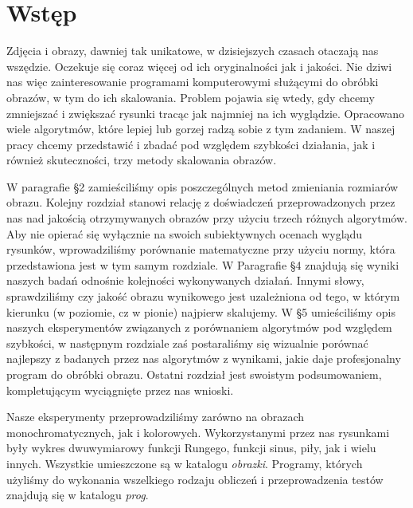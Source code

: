 \section{Wstęp}
Zdjęcia i obrazy, dawniej tak unikatowe, w dzisiejszych czasach otaczają nas
wszędzie. Oczekuje się coraz więcej od ich oryginalności jak i jakości. Nie
dziwi nas więc zainteresowanie programami komputerowymi służącymi do obróbki
obrazów, w tym do ich skalowania. Problem pojawia się wtedy, gdy chcemy zmniejszać i zwiększać
rysunki tracąc jak najmniej na ich wyglądzie. Opracowano wiele algorytmów,
które lepiej lub gorzej radzą sobie z tym zadaniem. W naszej pracy chcemy
przedstawić i zbadać pod względem szybkości działania, jak i również
skuteczności, trzy metody skalowania obrazów.

W paragrafie \S2 zamieściliśmy opis poszczególnych metod zmieniania
rozmiarów obrazu. Kolejny rozdział stanowi relację z doświadczeń
przeprowadzonych przez nas nad jakością otrzymywanych obrazów przy
użyciu trzech różnych algorytmów. Aby nie opierać się wyłącznie na swoich
subiektywnych ocenach wyglądu rysunków, wprowadziliśmy porównanie
matematyczne przy użyciu normy, która przedstawiona jest w tym samym rozdziale.
W Paragrafie \S4 znajdują się wyniki naszych badań odnośnie kolejności
wykonywanych działań. Innymi słowy, sprawdziliśmy czy jakość obrazu
wynikowego jest uzależniona od tego, w którym kierunku (w poziomie, cz w pionie) najpierw skalujemy.
W \S5 umieściliśmy opis naszych eksperymentów związanych z porównaniem
algorytmów pod względem szybkości, w następnym rozdziale zaś
postaraliśmy się wizualnie porównać najlepszy z badanych przez nas algorytmów
z wynikami, jakie daje profesjonalny program do obróbki obrazu. Ostatni
rozdział jest swoistym podsumowaniem, kompletującym wyciągnięte przez nas
wnioski.

Nasze eksperymenty przeprowadziliśmy zarówno na obrazach monochromatycznych,
jak i kolorowych. Wykorzystanymi przez nas rysunkami były wykres dwuwymiarowy
funkcji Rungego, funkcji sinus, piły, jak i wielu innych. Wszystkie umieszczone są w katalogu \textit{obrazki}. Programy, których
użyliśmy do wykonania wszelkiego rodzaju obliczeń i przeprowadzenia testów znajdują się w katalogu \textit{prog}.

